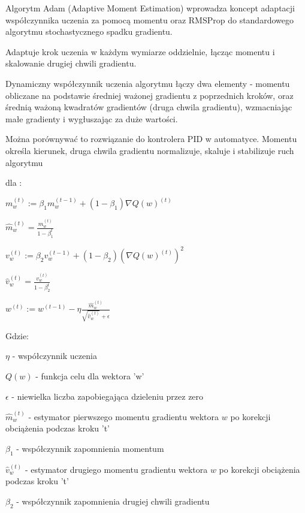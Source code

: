 
Algorytm Adam (Adaptive Moment Estimation) wprowadza koncept adaptacji współczynnika uczenia za pomocą momentu oraz RMSProp do standardowego algorytmu stochastycznego spadku gradientu. 

Adaptuje krok uczenia w każdym wymiarze oddzielnie, łącząc momentu i skalowanie drugiej chwili gradientu. 

Dynamiczny współczynnik uczenia algorytmu łączy dwa elementy - momentu obliczane na podstawie średniej ważonej gradientu z poprzednich kroków, oraz średnią ważoną kwadratów gradientów (druga chwila gradientu), wzmacniając małe gradienty i wygłuszając za duże wartości.

Można porównywać to rozwiązanie do kontrolera PID w automatyce. Momentu określa kierunek, druga chwila gradientu normalizuje, skaluje i stabilizuje ruch algorytmu

dla :

$m^{(t)}_w := \beta_1  m^{(t-1)}_w + (1 - \beta_1) \nabla Q(w)^{(t)}  $

$\hat{m}^{(t)}_w = \frac{m^{(t)}_w}{1 - \beta_1^t}$

$v^{(t)}_w := \beta_2  v^{(t-1)}_w + (1 - \beta_2) (\nabla Q(w)^{(t)} )^2 $

$\hat{v}^{(t)}_w = \frac{v^{(t)}_w}{1 - \beta_2^t}$

$w^{(t)} := w^{(t-1)} - \eta \frac{\hat{m}_w^{(t)}}{\sqrt{\hat{v}_w^{(t)}}+ \epsilon}  $

Gdzie: 

$\eta$ - współczynnik uczenia 

$Q(w)$ - funkcja celu dla wektora 'w'

$\epsilon$ - niewielka liczba zapobiegająca dzieleniu przez zero

$\hat{m}^{(t)}_w $ - estymator pierwszego momentu gradientu wektora $w$ po korekcji obciążenia podczas kroku 't'

$\beta_1$ - współczynnik zapomnienia momentum

$\hat{v}^{(t)}_w$ - estymator drugiego momentu gradientu wektora $w$ po korekcji obciążenia podczas kroku 't'

$\beta_2$ - współczynnik zapomnienia drugiej chwili gradientu

